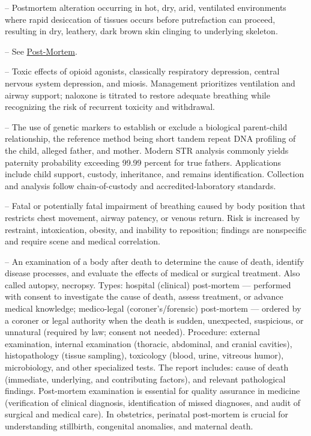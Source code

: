 -- Postmortem alteration occurring in hot, dry, arid, ventilated environments where rapid desiccation of tissues occurs before putrefaction can proceed, resulting in dry, leathery, dark brown skin clinging to underlying skeleton.

-- See \hyperlink{Post-Mortem}{Post-Mortem}.

-- Toxic effects of opioid agonists, classically respiratory depression, central nervous system depression, and miosis. Management prioritizes ventilation and airway support; naloxone is titrated to restore adequate breathing while recognizing the risk of recurrent toxicity and withdrawal.

-- The use of genetic markers to establish or exclude a biological parent-child relationship, the reference method being short tandem repeat DNA profiling of the child, alleged father, and mother. Modern STR analysis commonly yields paternity probability exceeding 99.99 percent for true fathers. Applications include child support, custody, inheritance, and remains identification. Collection and analysis follow chain-of-custody and accredited-laboratory standards.

-- Fatal or potentially fatal impairment of breathing caused by body position that restricts chest movement, airway patency, or venous return. Risk is increased by restraint, intoxication, obesity, and inability to reposition; findings are nonspecific and require scene and medical correlation.

-- An examination of a body after death to determine the cause of death, identify disease processes, and evaluate the effects of medical or surgical treatment. Also called autopsy, necropsy. Types: hospital (clinical) post-mortem — performed with consent to investigate the cause of death, assess treatment, or advance medical knowledge; medico-legal (coroner's/forensic) post-mortem — ordered by a coroner or legal authority when the death is sudden, unexpected, suspicious, or unnatural (required by law; consent not needed). Procedure: external examination, internal examination (thoracic, abdominal, and cranial cavities), histopathology (tissue sampling), toxicology (blood, urine, vitreous humor), microbiology, and other specialized tests. The report includes: cause of death (immediate, underlying, and contributing factors), and relevant pathological findings. Post-mortem examination is essential for quality assurance in medicine (verification of clinical diagnosis, identification of missed diagnoses, and audit of surgical and medical care). In obstetrics, perinatal post-mortem is crucial for understanding stillbirth, congenital anomalies, and maternal death.

